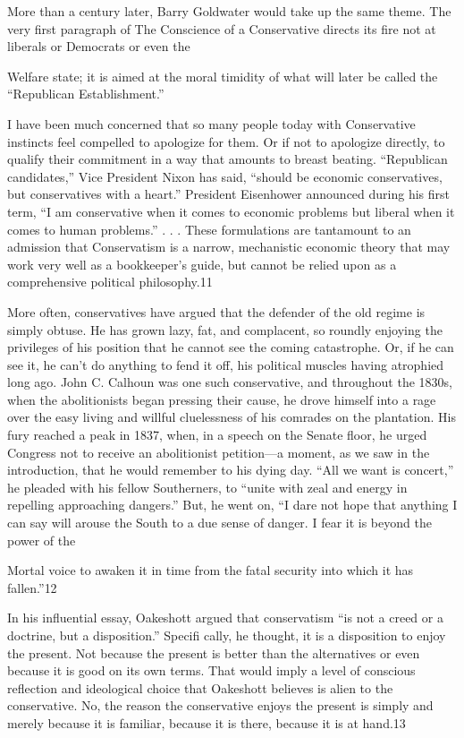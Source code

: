  \par 
More than a century later, Barry Goldwater would take up the same theme. The very first paragraph of The Conscience of a Conservative directs its fire not at liberals or Democrats or even the
 \par 
Welfare state; it is aimed at the moral timidity of what will later be called the “Republican Establishment.”
 \par 
I have been much concerned that so many people today with Conservative instincts feel compelled to apologize for them. Or if not to apologize directly, to qualify their commitment in a way that amounts to breast beating. “Republican candidates,” Vice President Nixon has said, “should be economic conservatives, but conservatives with a heart.” President Eisenhower announced during his first term, “I am conservative when it comes to economic problems but liberal when it comes to human problems.” . . . These formulations are tantamount to an admission that Conservatism is a narrow, mechanistic economic theory that may work very well as a bookkeeper’s guide, but cannot be relied upon as a comprehensive political philosophy.{\color{blue}11}
 \par 
More often, conservatives have argued that the defender of the old regime is simply obtuse. He has grown lazy, fat, and complacent, so roundly enjoying the privileges of his position that he cannot see the coming catastrophe. Or, if he can see it, he can’t do anything to fend it off, his political muscles having atrophied long ago. John C. Calhoun was one such conservative, and throughout the 1830s, when the abolitionists began pressing their cause, he drove himself into a rage over the easy living and willful cluelessness of his comrades on the plantation. His fury reached a peak in 1837, when, in a speech on the Senate floor, he urged Congress not to receive an abolitionist petition—a moment, as we saw in the introduction, that he would remember to his dying day. “All we want is concert,” he pleaded with his fellow Southerners, to “unite with zeal and energy in repelling approaching dangers.” But, he went on, “I dare not hope that anything I can say will arouse the South to a due sense of danger. I fear it is beyond the power of the
 \par 
Mortal voice to awaken it in time from the fatal security into which it has fallen.”{\color{blue}12}
 \par 
In his influential essay, Oakeshott argued that conservatism “is not a creed or a doctrine, but a disposition.” Specifi cally, he thought, it is a disposition to enjoy the present. Not because the present is better than the alternatives or even because it is good on its own terms. That would imply a level of conscious reflection and ideological choice that Oakeshott believes is alien to the conservative. No, the reason the conservative enjoys the present is simply and merely because it is familiar, because it is there, because it is at hand.{\color{blue}13}
